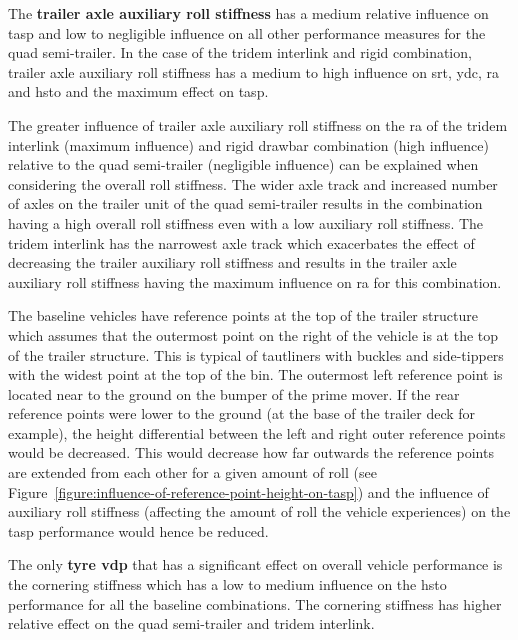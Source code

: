 The \textbf{trailer axle auxiliary roll stiffness} has a medium relative influence on \gls{tasp} and low to negligible influence on all other performance measures for the quad semi-trailer. In the case of the tridem interlink and rigid combination, trailer axle auxiliary roll stiffness has a medium to high influence on \gls{srt}, \gls{ydc}, \gls{ra} and \gls{hsto} and the maximum effect on \gls{tasp}.

The greater influence of trailer axle auxiliary roll stiffness on the \gls{ra} of the tridem interlink (maximum influence) and rigid drawbar combination (high influence) relative to the quad semi-trailer (negligible influence) can be explained when considering the overall roll stiffness. The wider axle track and increased number of axles on the trailer unit of the quad semi-trailer results in the combination having a high overall roll stiffness even with a low auxiliary roll stiffness. The tridem interlink has the narrowest axle track which exacerbates the effect of decreasing the trailer auxiliary roll stiffness and results in the trailer axle auxiliary roll stiffness having the maximum influence on \gls{ra} for this combination.

The baseline vehicles have reference points at the top of the trailer structure which assumes that the outermost point on the right of the vehicle is at the top of the trailer structure. This is typical of tautliners with buckles and side-tippers with the widest point at the top of the bin. The outermost left reference point is located near to the ground on the bumper of the prime mover. If the rear reference points were lower to the ground (at the base of the trailer deck for example), the height differential between the left and right outer reference points would be decreased. This would decrease how far outwards the reference points are extended from each other for a given amount of roll (see Figure~\ref{figure:influence-of-reference-point-height-on-tasp}) and the influence of auxiliary roll stiffness (affecting the amount of roll the vehicle experiences) on the \gls{tasp} performance would hence be reduced.

The only \textbf{tyre \gls{vdp}} that has a significant effect on overall vehicle performance is the cornering stiffness which has a low to medium influence on the \gls{hsto} performance for all the baseline combinations. The cornering stiffness has higher relative effect on the quad semi-trailer and tridem interlink.

